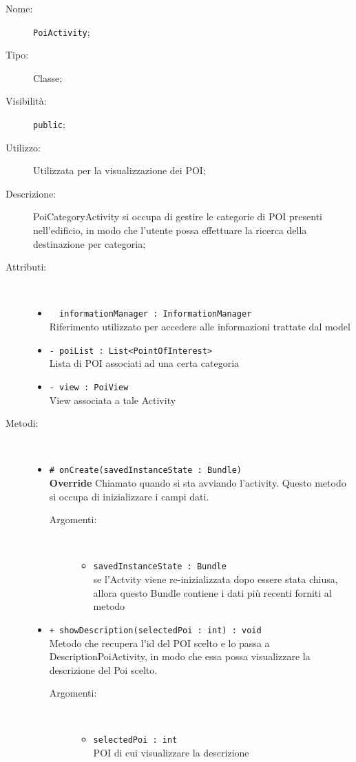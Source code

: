 \documentclass[../DefinizioneDiProdotto.tex]{subfiles}
\begin{document}
\begin{description}
	\item[Nome:] \texttt{PoiActivity};
	\item[Tipo:] Classe;
	\item[Visibilità:] \texttt{public};
	\item[Utilizzo:] Utilizzata per la visualizzazione dei POI;
	\item[Descrizione:] PoiCategoryActivity si occupa di gestire le categorie di POI presenti nell'edificio, in modo che l'utente possa effettuare la ricerca della destinazione per categoria;
	\item[Attributi:] \
	\begin{itemize}
		\item \texttt{~ informationManager : InformationManager}\\
		Riferimento utilizzato per accedere alle informazioni trattate dal model
		
		\item \texttt{- poiList : List<PointOfInterest>}\\
		Lista di POI associati ad una certa categoria
		
		\item \texttt{- view : PoiView}\\
		View associata a tale Activity 
		
	\end{itemize}
	\item[Metodi:] \
	\begin{itemize}
		\item \texttt{\# onCreate(savedInstanceState : Bundle)}\\
		\textbf{Override} Chiamato quando si sta avviando l'activity. Questo metodo si occupa di inizializzare i campi dati.
		\begin{description}
			\item[Argomenti:] \
			\begin{itemize}
				\item \texttt{savedInstanceState : Bundle}\\
				se l'Actvity viene re-inizializzata dopo essere stata chiusa, allora questo Bundle contiene i dati più recenti forniti al metodo\end{itemize}
		\end{description}
		\item \texttt{+ showDescription(selectedPoi : int) : void}\\
		Metodo che recupera l'id del POI scelto e lo passa a DescriptionPoiActivity, in modo che essa possa visualizzare la descrizione del Poi scelto.
		\begin{description}
			\item[Argomenti:] \
			\begin{itemize}
				\item \texttt{selectedPoi : int}\\
				POI di cui visualizzare la descrizione\end{itemize}
		\end{description}
	\end{itemize}
\end{description}
\end{document}
